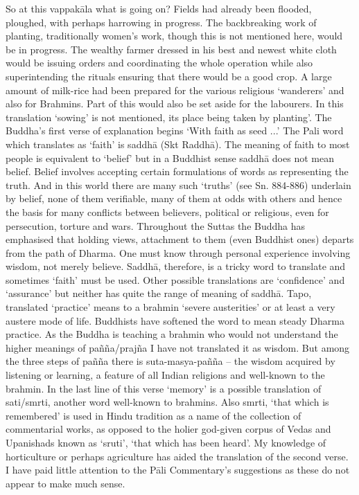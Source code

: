 So at this vappak\=ala what is going on? Fields had already been flooded, ploughed, with perhaps harrowing in progress. The backbreaking work of planting, traditionally women's work, though this is not mentioned here, would be in progress. The wealthy farmer dressed in his best and newest white cloth would be issuing orders and coordinating the whole operation while also superintending the rituals ensuring that there would be a good crop. A large amount of milk-rice had been prepared for the various religious `wanderers' and also for Brahmins. Part of this would also be set aside for the labourers.
In this translation `sowing' is not mentioned, its place being taken by planting'.
The Buddha's first verse of explanation begins `With faith as seed ...' The Pali word which translates as `faith' is saddh\=a (Skt Raddh\=a). The meaning of faith to most people is equivalent to `belief' but in a Buddhist sense saddh\=a does not mean belief. Belief involves accepting certain formulations of words as representing the truth. And in this world there are many such `truths' (see Sn. 884-886) underlain by belief, none of them verifiable, many of them at odds with others and hence the basis for many conflicts between believers, political or religious, even for persecution, torture and wars. Throughout the Suttas the Buddha has emphasised that holding views, attachment to them (even Buddhist ones) departs from the path of Dharma. One must know through personal experience involving wisdom, not merely believe. Saddh\=a, therefore, is a tricky word to translate and sometimes `faith' must be used. Other possible translations are `confidence' and `assurance' but neither has quite the range of meaning of saddh\=a.
Tapo, translated `practice' means to a brahmin `severe austerities' or at least a very austere mode of life. Buddhists have softened the word to mean steady Dharma practice. As the Buddha is teaching a brahmin who would not understand the higher meanings of pa\~n\~na/praj\~na I have not translated it as wisdom. But among the three steps of pa\~n\~na there is suta-masya-pa\~n\~na – the wisdom acquired by listening or learning, a feature of all Indian religions and well-known to the brahmin. In the last line of this verse `memory' is a possible translation of sati/smrti, another word well-known to brahmins. Also smrti, `that which is remembered' is used in Hindu tradition as a name of the collection of commentarial works, as opposed to the holier god-given corpus of Vedas and Upanishads known as `sruti', `that which has been heard'.
My knowledge of horticulture or perhaps agriculture has aided the translation of the second verse. I have paid little attention to the P\=ali Commentary's suggestions as these do not appear to make much sense.
